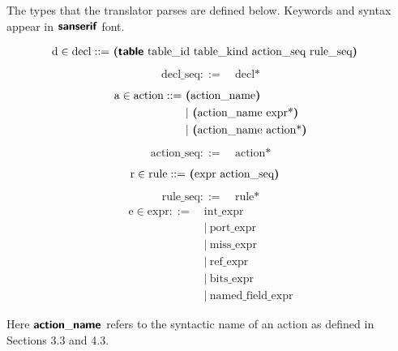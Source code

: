 The types that the translator parses are defined below. Keywords and syntax appear in $\bm{\mathsf{{san serif}}}$ font.
\begin{mdframed}
\begin{align*} %
  \text{d} \in \text{decl} ::=~& \mathct{(table} \ \text{table\_id table\_kind action\_seq rule\_seq}\mathct{)}
\end{align*}
\begin{align*} %
  \text{decl\_seq} ::=~& \text{decl*}
\end{align*}
\begin{align*} %
  \text{a} \in \text{action} ::=~& \mathct{(}\text{action\_name}\mathct{)} \\
  & | \ \mathct{(}\text{action\_name expr*}\mathct{)} \\ 
  & | \ \mathct{(}\text{action\_name action*}\mathct{)}
\end{align*}
\begin{align*} %
  \text{action\_seq} ::=~& \text{action*}
\end{align*}
\begin{align*} %
  \text{r} \in \text{rule} ::=~& \mathct{(}\text{expr action\_seq}\mathct{)}
\end{align*}
\begin{align*} %
  \text{rule\_seq} ::=~& \text{rule*}
\end{align*}
\begin{align*} %
  \text{e} \in \text{expr} ::=~& \text{int\_expr} \\
  & | \ \text{port\_expr} \\
  & | \ \text{miss\_expr} \\
  & | \ \text{ref\_expr} \\
  & | \ \text{bits\_expr} \\
  & | \ \text{named\_field\_expr}
\end{align*}
\end{mdframed}
Here $\bm{\mathsf{{action\_name}}}$ refers to the syntactic name of an action as defined in Sections 3.3 and 4.3.

